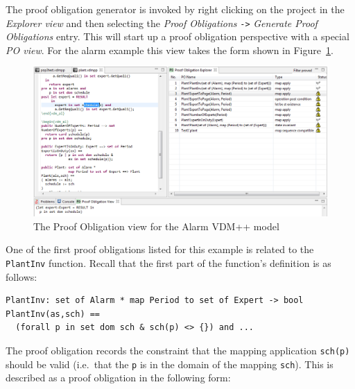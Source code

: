 The proof obligation generator is invoked by right clicking on the
project in the \emph{Explorer view} and then selecting the \emph{Proof
  Obligations} \texttt{->} \emph{Generate Proof Obligations}
entry. This will start up a proof obligation perspective with a
special \emph{PO view}. For the alarm example this view takes the form
shown in Figure~\ref{fig:POview}.

\begin{figure}[htbp]
\begin{center}
\includegraphics[width=4.5in]{figures/poview}
\caption{The Proof Obligation view for the Alarm VDM++ model\label{fig:POview}}
\end{center}
\end{figure}

One of the first proof obligations listed for this example is related
to the \texttt{PlantInv} function. Recall that the first part of the
function's definition is as follows:

\begin{lstlisting}
PlantInv: set of Alarm * map Period to set of Expert -> bool
PlantInv(as,sch) ==
  (forall p in set dom sch & sch(p) <> {}) and ...
\end{lstlisting}


The proof obligation records the constraint that the mapping application
\texttt{sch(p)} should be valid (i.e.\ that the \texttt{p} is in the
domain of the mapping \texttt{sch}). This is described as a proof
obligation in the following form:

